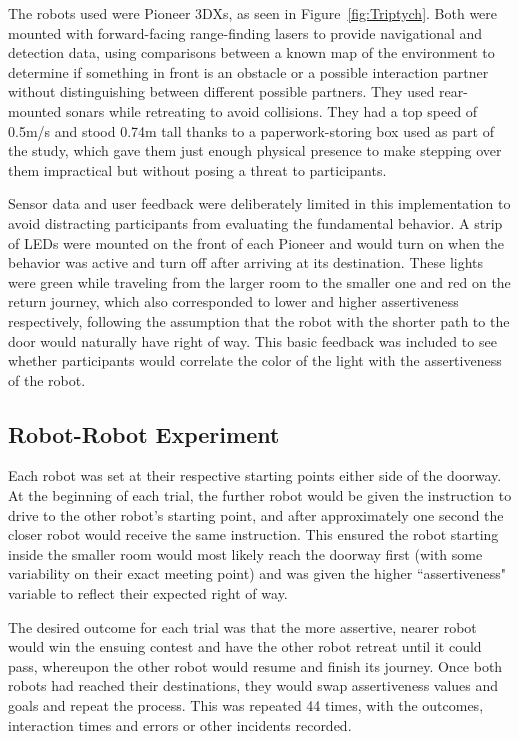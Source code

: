 \documentclass[letterpaper, 10 pt, conference]{ieeeconf}  %
\begin{document}
The robots used were Pioneer 3DXs, as seen in Figure~\ref{fig:Triptych}. Both were mounted with forward-facing range-finding lasers to provide navigational and detection data, using comparisons between a known map of the environment to determine if something in front is an obstacle or a possible interaction partner without distinguishing between different possible partners. They used rear-mounted sonars while retreating to avoid collisions. They had a top speed of 0.5m/s and stood 0.74m tall thanks to a paperwork-storing box used as part of the study, which gave them just enough physical presence to make stepping over them impractical but without posing a threat to participants.

Sensor data and user feedback were deliberately limited in this implementation to avoid distracting participants from evaluating the fundamental behavior. A strip of LEDs were mounted on the front of each Pioneer and would turn on when the behavior was active and turn off after arriving at its destination. These lights were green while traveling from the larger room to the smaller one and red on the return journey, which also corresponded to lower and higher assertiveness respectively, following the assumption that the robot with the shorter path to the door would naturally have right of way. This basic feedback was included to see whether participants would correlate the color of the light with the assertiveness of the robot.


\subsection{Robot-Robot Experiment}

Each robot was set at their respective starting points either side of the doorway. At the beginning of each trial, the further robot would be given the instruction to drive to the other robot’s starting point, and after approximately one second the closer robot would receive the same instruction. This ensured the robot starting inside the smaller room would most likely reach the doorway first (with some variability on their exact meeting point) and was given the higher ``assertiveness" variable to reflect their expected right of way.

The desired outcome for each trial was that the more assertive, nearer robot would win the ensuing contest and have the other robot retreat until it could pass, whereupon the other robot would resume and finish its journey. Once both robots had reached their destinations, they would swap assertiveness values and goals and repeat the process. This was repeated 44 times, with the outcomes, interaction times and errors or other incidents recorded. 
\end{document}
